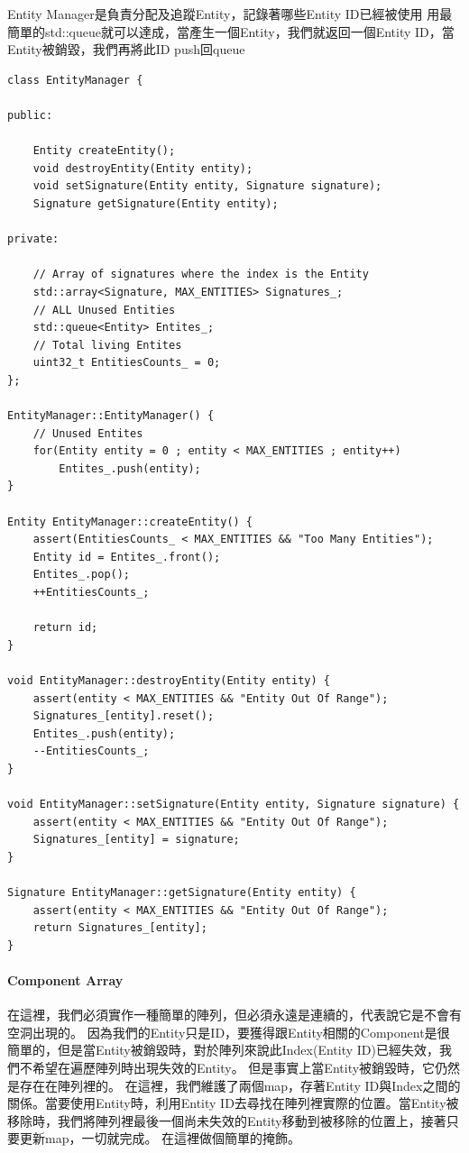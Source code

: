 Entity Manager是負責分配及追蹤Entity，記錄著哪些Entity ID已經被使用
用最簡單的std::queue就可以達成，當產生一個Entity，我們就返回一個Entity ID，當Entity被銷毀，我們再將此ID push回queue

\begin{lstlisting}
class EntityManager {

public:	

    Entity createEntity();
    void destroyEntity(Entity entity);
    void setSignature(Entity entity, Signature signature);
    Signature getSignature(Entity entity);

private: 

    // Array of signatures where the index is the Entity
    std::array<Signature, MAX_ENTITIES> Signatures_;
    // ALL Unused Entities
    std::queue<Entity> Entites_;
    // Total living Entites
    uint32_t EntitiesCounts_ = 0;
};

EntityManager::EntityManager() {
    // Unused Entites
    for(Entity entity = 0 ; entity < MAX_ENTITIES ; entity++)
        Entites_.push(entity);
}

Entity EntityManager::createEntity() {
    assert(EntitiesCounts_ < MAX_ENTITIES && "Too Many Entities");
    Entity id = Entites_.front();
    Entites_.pop();
    ++EntitiesCounts_;

    return id;
}

void EntityManager::destroyEntity(Entity entity) {
    assert(entity < MAX_ENTITIES && "Entity Out Of Range");
    Signatures_[entity].reset();
    Entites_.push(entity);
    --EntitiesCounts_;
}

void EntityManager::setSignature(Entity entity, Signature signature) {
    assert(entity < MAX_ENTITIES && "Entity Out Of Range");
    Signatures_[entity] = signature;
}

Signature EntityManager::getSignature(Entity entity) {
    assert(entity < MAX_ENTITIES && "Entity Out Of Range");
    return Signatures_[entity];
}
\end{lstlisting}



\paragraph{Component Array}
在這裡，我們必須實作一種簡單的陣列，但必須永遠是連續的，代表說它是不會有空洞出現的。
因為我們的Entity只是ID，要獲得跟Entity相關的Component是很簡單的，但是當Entity被銷毀時，對於陣列來說此Index(Entity ID)已經失效，我們不希望在遍歷陣列時出現失效的Entity。
但是事實上當Entity被銷毀時，它仍然是存在在陣列裡的。
在這裡，我們維護了兩個map，存著Entity ID與Index之間的關係。當要使用Entity時，利用Entity ID去尋找在陣列裡實際的位置。當Entity被移除時，我們將陣列裡最後一個尚未失效的Entity移動到被移除的位置上，接著只要更新map，一切就完成。
在這裡做個簡單的掩飾。

